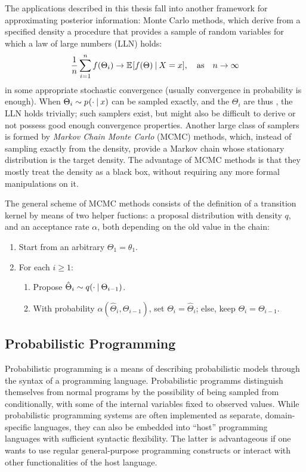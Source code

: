 The applications described in this thesis fall into another framework for approximating posterior
information: Monte Carlo methods, which derive from a specified density a procedure that provides a
sample of random variables for which a law of large numbers (LLN) holds:
\begin{equation}
  \label{eq:lln}
  \frac{1}{n} \sum_{i=1}^{n} f(\Theta_{i}) \to \Exp{f(\Theta) \given X = x}, \quad \text{as} \quad n
  \to \infty
\end{equation}
in some appropriate stochastic convergence (usually convergence in probability is enough).  When
\(\Theta_{i} \sim \prob{\cdot \given x}\) can be sampled exactly, and the \(\Theta_{i}\) are thus
\iid, the LLN holds trivially; such samplers exist, but might also be difficult to derive or not
possess good enough convergence properties.  Another large class of samplers is formed by
\emph{Markov Chain Monte Carlo} (MCMC) methods, which, instead of sampling exactly from the density,
provide a Markov chain whose stationary distribution is the target density.  The advantage of MCMC
methods is that they mostly treat the density as a black box, without requiring any more formal
manipulations on it.

The general scheme of MCMC methods consists of the definition of a transition kernel by means of two
helper fuctions: a proposal distribution with density \(q\), and an acceptance rate \(\alpha\), both
depending on the old value in the chain:
\begin{enumerate}
\item Start from an arbitrary \(\Theta_{1} = \theta_{1}\).
\item For each \(i \ge 1\):
  \begin{enumerate}
  \item Propose \(\hat{\Theta}_{i} \sim q(\cdot \:\vert\: \Theta_{i-1})\).
  \item With probability \(\alpha(\hat{\Theta}_{i}, \Theta_{i-1})\), set \(\Theta_{i} =
    \hat{\Theta}_{i}\); else, keep \(\Theta_{i} = \Theta_{i-1}\).
  \end{enumerate}
\end{enumerate}


\subsection{Probabilistic Programming}
\label{sec:prob-prog}

Probabilistic programming is a means of describing probabilistic models through the syntax of a
programming language. Probabilistic programms distinguish themselves from normal programs by the
possibility of being sampled from conditionally, with some of the internal variables fixed to
observed values.  While probabilistic programming systems are often implemented as separate,
domain-specific languages, they can also be embedded into \enquote{host} programming languages with
sufficient syntactic flexibility.  The latter is advantageous if one wants to use regular
general-purpose programming constructs or interact with other functionalities of the host language.




